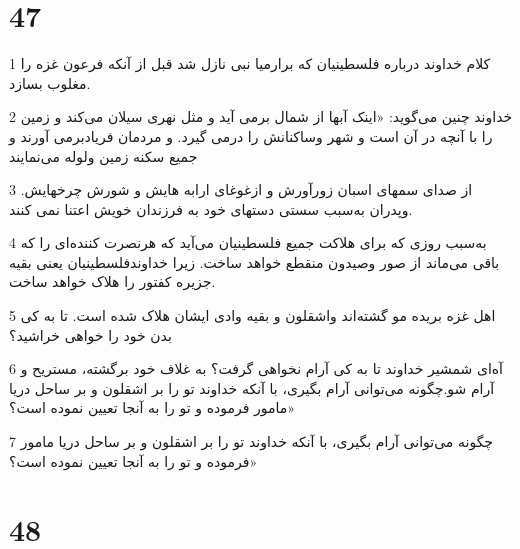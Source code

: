 \chapter{47}

\par 1 کلام خداوند درباره فلسطینیان که برارمیا نبی نازل شد قبل از آنکه فرعون غزه را مغلوب بسازد.
\par 2 خداوند چنین می‌گوید: «اینک آبها از شمال برمی آید و مثل نهری سیلان می‌کند و زمین را با آنچه در آن است و شهر وساکنانش را درمی گیرد. و مردمان فریادبرمی آورند و جمیع سکنه زمین ولوله می‌نمایند
\par 3 از صدای سمهای اسبان زورآورش و ازغوغای ارابه هایش و شورش چرخهایش. وپدران به‌سبب سستی دستهای خود به فرزندان خویش اعتنا نمی کنند.
\par 4 به‌سبب روزی که برای هلاکت جمیع فلسطینیان می‌آید که هرنصرت کننده‌ای را که باقی می‌ماند از صور وصیدون منقطع خواهد ساخت. زیرا خداوندفلسطینیان یعنی بقیه جزیره کفتور را هلاک خواهد ساخت.
\par 5 اهل غزه بریده مو گشته‌اند واشقلون و بقیه وادی ایشان هلاک شده است. تا به کی بدن خود را خواهی خراشید؟
\par 6 آه‌ای شمشیر خداوند تا به کی آرام نخواهی گرفت؟ به غلاف خود برگشته، مستریح و آرام شو.چگونه می‌توانی آرام بگیری، با آنکه خداوند تو را بر اشقلون و بر ساحل دریا مامور فرموده و تو را به آنجا تعیین نموده است؟»
\par 7 چگونه می‌توانی آرام بگیری، با آنکه خداوند تو را بر اشقلون و بر ساحل دریا مامور فرموده و تو را به آنجا تعیین نموده است؟»
 
\chapter{48}

